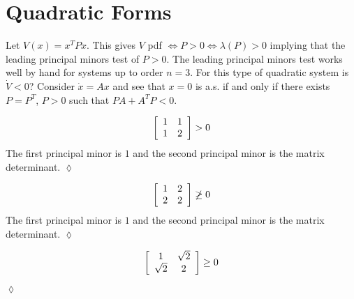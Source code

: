 
\mainmatter
\setcounter{page}{1}

\lectureseries[\course]{\course}

\date{February 2, 2010}

\setaddress

\setcounter{lecture}{8}
\setcounter{chapter}{8}


\section{Quadratic Forms}
Let $V(x)=x^TPx$. This gives $V$ pdf $\Leftrightarrow P>0 \Leftrightarrow \lambda(P)>0$ implying that the leading principal minors test of $P>0$. The leading principal minors test works well by hand for systems up to order $n=3$. For this type of quadratic system is $\dot{V}<0$? Consider $\dot{x}=Ax$ and see that $x=0$ is a.s. if and only if there exists $P=P^T$, $P>0$ such that $PA+A^TP<0$.

\begin{example}
\begin{align*}
\left[\begin{array}{c c} 1 & 1 \\ 1 & 2 \end{array}\right]>0
\end{align*}
The first principal minor is $1$ and the second principal minor is the matrix determinant.
$\lozenge$
\end{example}

\begin{example}
\begin{align*}
\left[\begin{array}{c c} 1 & 2 \\ 2 & 2 \end{array}\right]\not\geq0
\end{align*}
The first principal minor is $1$ and the second principal minor is the matrix determinant.
$\lozenge$
\end{example}

\begin{example}
\begin{align*}
\left[\begin{array}{c c} 1 & \sqrt{2} \\ \sqrt{2} & 2 \end{array}\right]\geq0
\end{align*}
$\lozenge$
\end{example}

